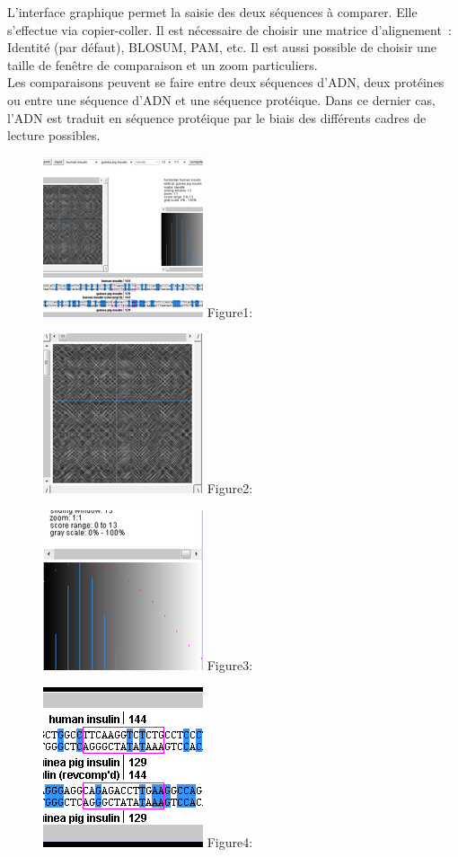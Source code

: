 \documentclass{report}
\begin{document}
L'interface graphique permet la saisie des deux séquences à comparer. Elle s'effectue via copier-coller. Il est nécessaire de choisir une matrice d'alignement~: Identité (par défaut), BLOSUM, PAM, etc. Il est aussi possible de choisir une taille de fenêtre de comparaison et un zoom particuliers.\\
Les comparaisons peuvent se faire entre deux séquences d'ADN, deux protéines ou entre une séquence d'ADN et une séquence protéique. Dans ce dernier cas, l'ADN est traduit en séquence protéique par le biais des différents cadres de lecture possibles.\\

\begin{figure}[!h]
\centering
\includegraphics{image3.png}
Figure1: 
\end{figure}
\begin{figure}[!h]
\centering
\includegraphics{image4.png}
Figure2:
\end{figure}
\begin{figure}[!h]
\centering
\includegraphics{image5.png}
Figure3:
\end{figure}
\begin{figure}[!h]
\centering
\includegraphics{image1.png}
Figure4:
\end{figure}
\end{document}
